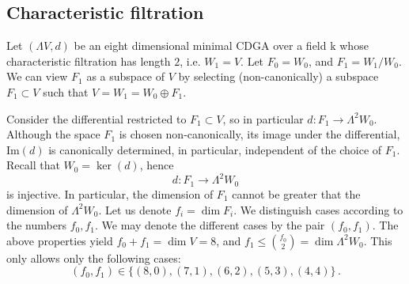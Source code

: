 \documentclass[10pt,reqno]{amsart}
\renewcommand{\L}{\Lambda}
\newcommand{\kk}{\mathrm{k}}
\newcommand{\frg}{\mathfrak{g}}
\newcommand{\tr}[1]{\textrm{#1}}
\theoremstyle{definition}
\begin{document}



\subsection{Characteristic filtration}

Let $(\L V, d)$ be an eight dimensional minimal CDGA over a field $\kk$ whose characteristic filtration has length $2$, i.e. $W_1=V$. Let $F_0=W_0$, and $F_1=W_1/W_0$. We can view $F_1$ as a subspace of $V$ by selecting (non-canonically) a subspace $F_1 \subset V$ such that $V=W_1=W_0 \oplus F_1$.

Consider the differential restricted to $F_1 \subset V$, so in particular $d\colon F_1 \to \L^2 W_0$. Although the space $F_1$ is chosen non-canonically, its image under the differential, $\tr{Im}(d)$ is canonically determined, in particular, independent of the choice of $F_1$. Recall that $W_0=\ker(d)$, hence
\begin{equation} \label{eq:d-injective}
    d\colon F_1 \to \L^2 W_0
\end{equation}
is injective. In particular, the dimension of $F_1$ cannot be greater that the dimension of $\L^2 W_0$. Let us denote $f_i=\dim F_i$. We distinguish cases according to the numbers $f_0, f_1$.
We may denote the different cases by the pair $(f_0,f_1)$. The above properties yield $f_0+f_1=\dim V=8$, and $f_1 \le {f_0 \choose 2}=\dim \L^2 W_0$. This only allows only the following cases:
\[
(f_0,f_1)\in\{(8,0),(7,1),(6,2),(5,3),(4,4)\}\,.
\]
\end{document}
